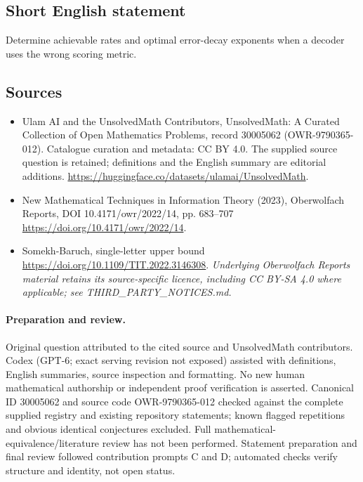\documentclass[11pt]{article}
\begin{document}
\subsection{Short English statement}
Determine achievable rates and optimal error-decay exponents when a decoder uses the wrong scoring metric.
\subsection{Sources}
\begin{itemize}
\item[\hypertarget{source:30005062:1}{S1}] Ulam AI and the UnsolvedMath Contributors, UnsolvedMath: A Curated Collection of Open Mathematics Problems, record 30005062 (OWR-9790365-012). Catalogue curation and metadata: CC BY 4.0. The supplied source question is retained; definitions and the English summary are editorial additions.
\url{https://huggingface.co/datasets/ulamai/UnsolvedMath}.
\item[\hypertarget{source:30005062:2}{S2}] New Mathematical Techniques in Information Theory (2023), Oberwolfach Reports, DOI 10.4171/owr/2022/14, pp. 683--707
\url{https://doi.org/10.4171/owr/2022/14}.
\item[\hypertarget{source:30005062:3}{S3}] Somekh-Baruch, single-letter upper bound
\url{https://doi.org/10.1109/TIT.2022.3146308}.
\textit{Underlying Oberwolfach Reports material retains its source-specific licence, including CC BY-SA 4.0 where applicable; see THIRD\_PARTY\_NOTICES.md.}
\end{itemize}
\paragraph{Preparation and review.}
Original question attributed to the cited source and UnsolvedMath contributors. Codex (GPT-6; exact serving revision not exposed) assisted with definitions, English summaries, source inspection and formatting. No new human mathematical authorship or independent proof verification is asserted. Canonical ID 30005062 and source code OWR-9790365-012 checked against the complete supplied registry and existing repository statements; known flagged repetitions and obvious identical conjectures excluded. Full mathematical-equivalence/literature review has not been performed. Statement preparation and final review followed contribution prompts C and D; automated checks verify structure and identity, not open status.
\label{end:30005062}
\end{document}
